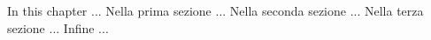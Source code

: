 In this chapter ...
Nella prima sezione ...
Nella seconda sezione ...
Nella terza sezione ...
Infine ...
